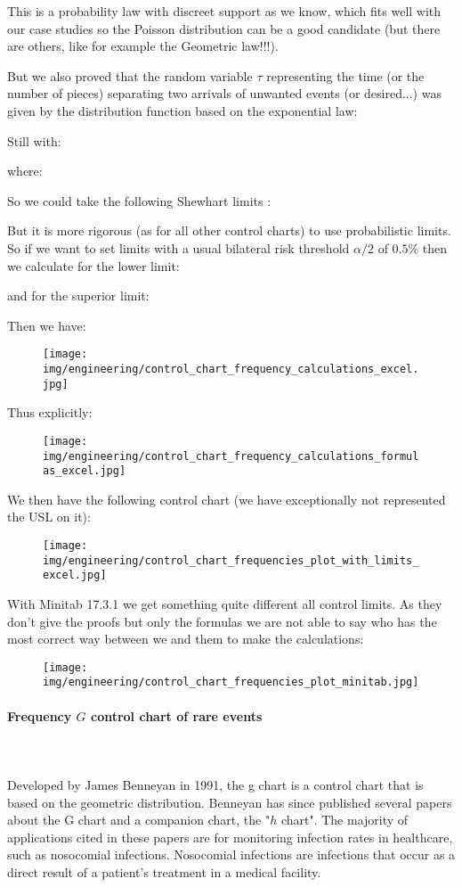 	This is a probability law with discreet support as we know, which fits well with our case studies so the Poisson distribution can be a good candidate (but there are others, like for example the Geometric law!!!).

	But we also proved that the random variable $\tau$ representing the time (or the number of pieces) separating two arrivals of unwanted events (or desired...) was given by the distribution function based on the exponential law:
	
	Still with:
	
	where:
	
	So we could take the following Shewhart limits :
	
	But it is more rigorous (as for all other control charts) to use probabilistic limits. So if we want to set limits with a usual bilateral risk threshold $\alpha/2$ of $0.5\%$ then we calculate for the lower limit:
	
	and for the superior limit:
	
	Then we have:
	\begin{figure}[H]
		\centering
		\texttt{[image: img/engineering/control\_chart\_frequency\_calculations\_excel.jpg]}
	\end{figure}
	Thus explicitly:
	\begin{figure}[H]
		\centering
		\texttt{[image: img/engineering/control\_chart\_frequency\_calculations\_formulas\_excel.jpg]}
	\end{figure}
	We then have the following control chart (we have exceptionally not represented the USL on it):
	\begin{figure}[H]
		\centering
		\texttt{[image: img/engineering/control\_chart\_frequencies\_plot\_with\_limits\_excel.jpg]}
	\end{figure}
	With Minitab 17.3.1 we get something quite different all control limits. As they don't give the proofs but only the formulas we are not able to say who has the most correct way between we and them to make the calculations:
	\begin{figure}[H]
		\centering
		\texttt{[image: img/engineering/control\_chart\_frequencies\_plot\_minitab.jpg]}
	\end{figure}
	
	\paragraph{Frequency $G$ control chart of rare events}\mbox{}\\\\
	Developed by James Benneyan in 1991, the g chart  is a control chart that is based on the geometric distribution. Benneyan has since published several papers about the G chart and a companion chart, the "$h$ chart". The majority of applications cited in these papers are for monitoring infection rates in healthcare, such as nosocomial infections. Nosocomial infections are infections that occur as a direct result of a patient’s treatment in a medical facility.

